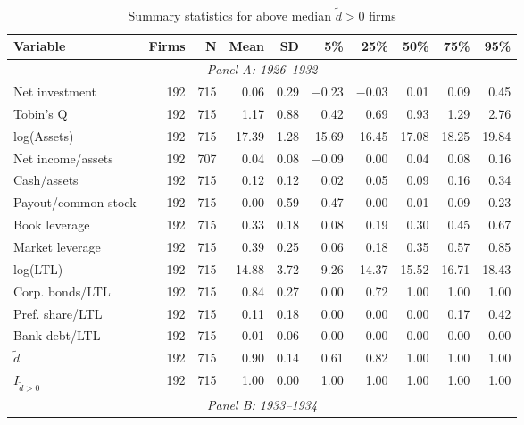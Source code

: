\begin{table}[p]\centering
    \caption{\\ Summary statistics for above median $\tilde{d} > 0$ firms}\scriptsize
    \label{tabapp:summary_I_larged}
    \begin{threeparttable}
        \begin{tabular}{lrrrrrrrrr}
            \toprule
            Variable & Firms & N & Mean & SD & 5\% & 25\% & 50\% & 75\% & 95\% \\
            \midrule
            \multicolumn{10}{c}{\textit{Panel A: 1926--1932}} \\
            \midrule
            Net investment & 192 & 715 & 0.06 & 0.29 & $-$0.23 & $-$0.03 & 0.01 & 0.09 & 0.45 \\
            Tobin's Q & 192 & 715 & 1.17 & 0.88 & 0.42 & 0.69 & 0.93 & 1.29 & 2.76 \\
            log(Assets) & 192 & 715 & 17.39 & 1.28 & 15.69 & 16.45 & 17.08 & 18.25 & 19.84 \\
            Net income/assets & 192 & 707 & 0.04 & 0.08 & $-$0.09 & 0.00 & 0.04 & 0.08 & 0.16 \\
            Cash/assets & 192 & 715 & 0.12 & 0.12 & 0.02 & 0.05 & 0.09 & 0.16 & 0.34 \\
            Payout/common stock & 192 & 715 & -0.00 & 0.59 & $-$0.47 & 0.00 & 0.01 & 0.09 & 0.23 \\
            Book leverage & 192 & 715 & 0.33 & 0.18 & 0.08 & 0.19 & 0.30 & 0.45 & 0.67 \\
            Market leverage & 192 & 715 & 0.39 & 0.25 & 0.06 & 0.18 & 0.35 & 0.57 & 0.85 \\
            log(LTL) & 192 & 715 & 14.88 & 3.72 & 9.26 & 14.37 & 15.52 & 16.71 & 18.43 \\
            Corp. bonds/LTL & 192 & 715 & 0.84 & 0.27 & 0.00 & 0.72 & 1.00 & 1.00 & 1.00 \\
            Pref. share/LTL & 192 & 715 & 0.11 & 0.18 & 0.00 & 0.00 & 0.00 & 0.17 & 0.42 \\
            Bank debt/LTL & 192 & 715 & 0.01 & 0.06 & 0.00 & 0.00 & 0.00 & 0.00 & 0.00 \\
            \ensuremath{\tilde{d}} & 192 & 715 & 0.90 & 0.14 & 0.61 & 0.82 & 1.00 & 1.00 & 1.00 \\
            \ensuremath{I_{\tilde{d}>0}} & 192 & 715 & 1.00 & 0.00 & 1.00 & 1.00 & 1.00 & 1.00 & 1.00 \\
            \midrule
            \multicolumn{10}{c}{\textit{Panel B: 1933--1934}} \\

\end{tabular}
\end{threeparttable}
\end{table}
